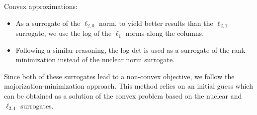 \documentclass{article}
\begin{document}
Convex approximations:
\begin{itemize}
  \item As a surrogate of the $\ell_{2,0}$ norm, to yield better results than the $\ell_{2,1}$ surrogate, we use the log of the $\ell_{1}$ norms along the columns.
  \item Following a similar reasoning, the log-det is used as a surrogate of the rank minimization instead of the nuclear norm surrogate.
\end{itemize}

Since both of these surrogates lead to a non-convex objective, we follow the majorization-minimization approach. This method relies on an initial guess which can be obtained as a solution of the convex problem based on the nuclear and $\ell_{2,1}$ surrogates.
\end{document}
